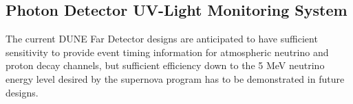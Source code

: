 
\subsection{Photon Detector UV-Light Monitoring System}
\label{sec_pd_calib}


	The current DUNE Far Detector designs are anticipated to have sufficient sensitivity to provide event timing information for atmospheric neutrino and proton decay channels, but sufficient efficiency down to the 5 MeV neutrino energy level desired by the supernova program has to be demonstrated in future designs.

